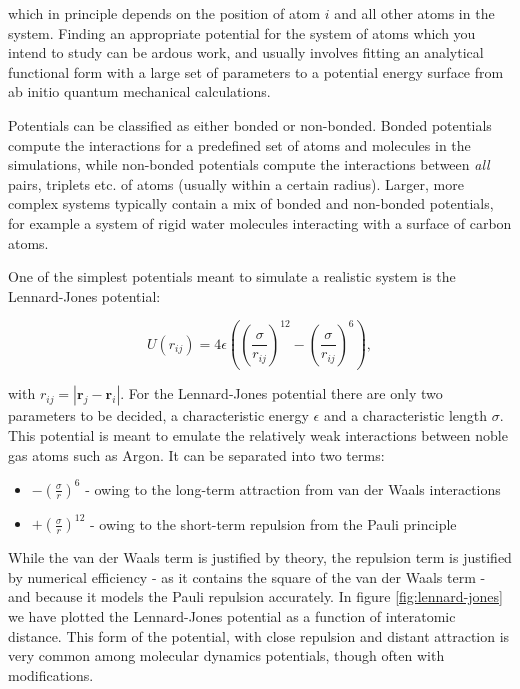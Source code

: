 which in principle depends on the position of atom $i$
and all other atoms in the system. Finding an appropriate potential
for the system of atoms which you intend to study can be ardous work,
and usually involves fitting an analytical functional form
with a large set of parameters to a potential energy surface
from ab initio quantum mechanical calculations.
\par
Potentials can be classified as either bonded or non-bonded.
Bonded potentials compute the interactions for a predefined
set of atoms and molecules in the simulations, while
non-bonded potentials compute the interactions
between \textit{all} pairs, triplets etc. of atoms
(usually within a certain radius).
Larger, more complex systems typically contain a mix of
bonded and non-bonded potentials, for example a system of rigid water molecules
interacting with a surface of carbon atoms.
\par
One of the simplest potentials meant to simulate a realistic system
is the Lennard-Jones potential:

\begin{equation}
 U(r_{ij}) = 4\epsilon \left(\left(\frac{\sigma}{r_{ij}}\right)^{12}
    - \left(\frac{\sigma}{r_{ij}}\right)^{6}\right) , 
\end{equation}

with $r_{ij} = \left| \bm{r}_j - \bm{r}_i \right|$.
For the Lennard-Jones potential there are only two parameters to be decided,
a characteristic energy $\epsilon$ and a characteristic length $\sigma$.
This potential is meant to emulate the relatively weak interactions
between noble gas atoms such as Argon.
It can be separated into two terms:

\begin{itemize}
    \item $\mathrel{-} \left(\frac{\sigma}{r}\right)^6$ - owing to the long-term
        attraction from van der Waals interactions
    \item $\mathrel{+} \left(\frac{\sigma}{r}\right)^{12}$ - owing to the short-term repulsion
        from the Pauli principle
\end{itemize}

While the van der Waals term is justified by theory, the repulsion term
is justified by numerical efficiency - as it contains the square of the van der Waals
term - and because it models the Pauli repulsion accurately.
In figure \ref{fig:lennard-jones} we have plotted the Lennard-Jones potential
as a function of interatomic distance.
This form of the potential, with close repulsion and distant attraction
is very common among molecular dynamics potentials, though often with
modifications.

